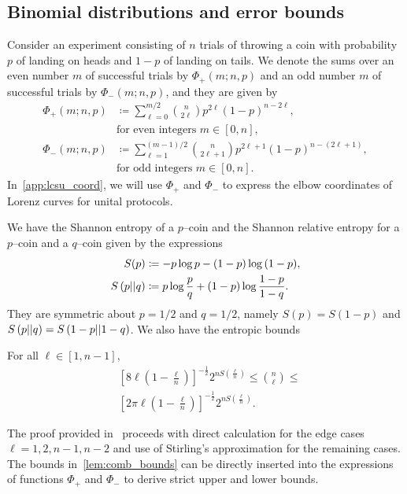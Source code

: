 \documentclass[pra,
aps,
twocolumn,
superscriptaddress,
groupedaddress,
nofootinbib,
reprint
]{revtex4-1}
\begin{document}
\subsection{Binomial distributions and error bounds}\label{app:phi}
Consider an experiment consisting of $n$ trials of throwing a coin with probability $p$ of landing on heads and $1-p$ of landing on tails.
We denote the sums over an even number $m$ of successful trials by $\Phi_+(m; n, p)$ and an odd number $m$ of successful trials by $\Phi_-(m; n, p)$, and they are given by
\begin{align}	
	\Phi_+(m; n, p) &\coloneqq \sum\limits_{\ell=0}^{m/2} \binom{n}{2\ell} p^{2\ell} (1-p)^{n-2\ell}, \nonumber\\ 
	&\text{for even integers } m\in[0,n], \label{eq:fp_app} \\
	\Phi_-(m; n, p) &\coloneqq \sum\limits_{\ell=1}^{(m-1)/2} \binom{n}{2\ell+1} p^{2\ell+1} (1-p)^{n-(2\ell+1)}, \nonumber\\ 
	&\text{for odd integers }m\in[0,n]. \label{eq:fn_app}
\end{align}
In~\cref{app:lcsu_coord}, we will use $\Phi_+$ and $\Phi_-$ to express the elbow coordinates of Lorenz curves for unital protocols.

We have the Shannon entropy of a $p$--coin and the Shannon relative entropy for a $p$--coin and a $q$--coin given by the expressions
\begin{align}
	S(p) &\coloneqq -p\log{p} -(1-p)\log{(1-p)}, \label{eq:ent}\\
	S\left( p \middle\vert\middle\vert q \right) &\coloneqq p \log{\frac{p}{q}} + (1-p) \log{\frac{1-p}{1-q}}. \label{eq:ent_rel}
\end{align}
They are symmetric about $p=1/2$ and $q=1/2$, namely $S(p) = S(1-p)$ and $S\left( p \middle\vert\middle\vert q \right) = S\left( 1-p \middle\vert\middle\vert 1-q \right)$. We also have the entropic bounds
\begin{lemma}\label{lem:comb_bounds}
	For all $\ell\in [1,n-1]$,
	\begin{align}
		&\left[ 8\ell\left(1-\frac{\ell}{n}\right) \right]^{-\frac{1}{2}} 2^{n S\left(\frac{\ell}{n}\right)} \leq \binom{n}{\ell} \leq \\
		&\left[ 2\pi \ell\left(1-\frac{\ell}{n}\right) \right]^{-\frac{1}{2}} 2^{n S\left(\frac{\ell}{n}\right)}.
	\end{align}
\end{lemma}
The proof provided in~\cite{cit:ash} proceeds with direct calculation for the edge cases $\ell = 1,2, n-1, n-2$ and use of Stirling's approximation for the remaining cases. The bounds in~\cref{lem:comb_bounds} can be directly inserted into the expressions of functions $\Phi_+$ and $\Phi_-$ to derive strict upper and lower bounds.
\end{document}
